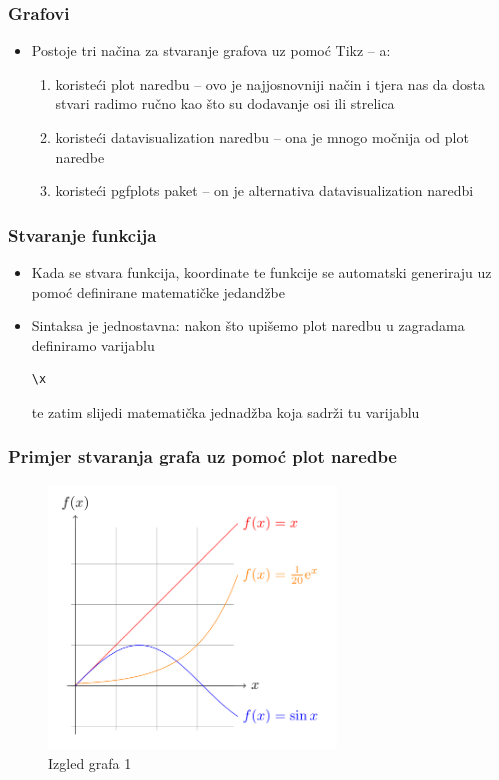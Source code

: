 \documentclass{beamer}
\begin{document}
	\begin{frame}
	\frametitle{Grafovi}
		\begin{itemize}
			\item Postoje tri načina za stvaranje grafova uz pomoć Tikz – a:
			\begin{enumerate}
			\item koristeći plot naredbu – ovo je najjosnovniji način i tjera nas da dosta stvari radimo ručno kao što su dodavanje osi ili strelica 
			\item koristeći datavisualization naredbu – ona je mnogo močnija od plot naredbe
			\item koristeći pgfplots paket – on je alternativa datavisualization naredbi
			\end{enumerate}	
		\end{itemize}
	\end{frame}	

\begin{frame}[fragile]
	\frametitle{Stvaranje funkcija}
		\begin{itemize}
			\item Kada se stvara funkcija, koordinate te funkcije se automatski generiraju uz pomoć definirane matematičke jedandžbe
			\item Sintaksa je jednostavna:
			nakon što upišemo plot naredbu u zagradama definiramo varijablu \begin{verbatim}\x\end{verbatim} te zatim slijedi matematička jednadžba koja sadrži tu varijablu
		\end{itemize}
\end{frame}	

	\begin{frame}
	\frametitle{Primjer stvaranja grafa uz pomoć plot naredbe}
		\begin{figure}
			\begin{center}
				\includegraphics[width=12 cm,height=7cm]{graf_1.png}
				\caption{Izgled grafa 1}
			\end{center}
		\end{figure}
	\end{frame}
\end{document}
